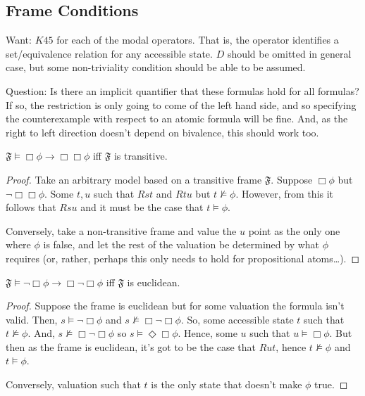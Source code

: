 \documentclass[10pt]{article}
\newcommand{\oframe}[1]{\ensuremath{\mathfrak{#1}}}
\begin{document}
\subsection{Frame Conditions}
\label{sec:frame-conditions}

Want: \(K45\) for each of the modal operators.
That is, the operator identifies a set/equivalence relation for any accessible state.
\(D\) should be omitted in general case, but some non-triviality condition should be able to be assumed.

{\color{red} Question: Is there an implicit quantifier that these formulas hold for all formulas?
  If so, the restriction is only going to come of the left hand side, and so specifying the counterexample with respect to an atomic formula will be fine.
And, as the right to left direction doesn't depend on bivalence, this should work too.}

\begin{proposition}[Transitivity]
  \(\oframe{F} \vDash \Box\phi \rightarrow \Box\Box\phi\) iff \(\oframe{F}\) is transitive.
  \begin{proof}
    Take an arbitrary model based on a transitive frame \(\oframe{F}\).
    Suppose \(\Box\phi\) but \(\lnot\Box\Box\phi\).
    Some \(t,u\) such that \(Rst\) and \(Rtu\) but \(t \nvDash \phi\).
    However, from this it follows that \(Rsu\) and it must be the case that \(t \vDash \phi\).

    Conversely, take a non-transitive frame and value the \(u\) point as the only one where \(\phi\) is false, and let the rest of the valuation be determined by what \(\phi\) requires (or, rather, perhaps this only needs to hold for propositional atoms\dots).
  \end{proof}
\end{proposition}

\begin{proposition}
  \(\oframe{F} \vDash \lnot\Box\phi \rightarrow \Box\lnot\Box\phi\) iff \(\oframe{F}\) is euclidean.
  \begin{proof}
    Suppose the frame is euclidean but for some valuation the formula isn't valid.
    Then, \(s \vDash \lnot\Box\phi\) and \(s \nvDash \Box\lnot\Box\phi\).
    So, some accessible state \(t\) such that \(t \nvDash \phi\).
    And, \(s \nvDash \Box\lnot\Box\phi\) so \(s \vDash \Diamond\Box\phi\).
    Hence, some \(u\) such that \(u \vDash \Box\phi\).
    But then as the frame is euclidean, it's got to be the case that \(Rut\), hence \(t \nvDash \phi\) and \(t \vDash \phi\).

    Conversely, valuation such that \(t\) is the only state that doesn't make \(\phi\) true.
  \end{proof}
\end{proposition}
\end{document}
